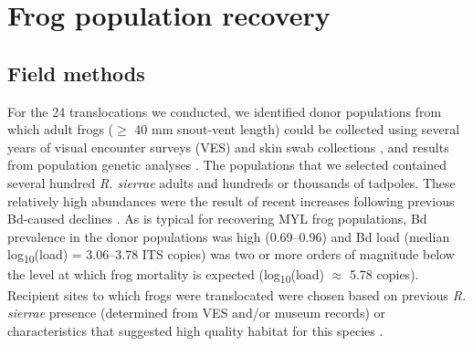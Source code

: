 \documentclass[9pt,twocolumn,twoside,lineno]{pnas-new}
\begin{document}
{\hypertarget{frog-population-recovery-1}{%
\section*{Frog population recovery}\label{frog-population-recovery-1}}

\hypertarget{field-methods}{%
\subsection*{Field methods}\label{field-methods}}

For the 24 translocations we conducted, we identified donor populations
from which adult frogs (\(\geq\) 40 mm snout-vent length) could be
collected using several years of visual encounter surveys (VES) and skin
swab collections \citep{knapp2016}, and results from population genetic
analyses \citep{poorten2017}. The populations that we selected contained
several hundred \emph{R. sierrae} adults and hundreds or thousands of
tadpoles. These relatively high abundances were the result of recent
increases following previous Bd-caused declines \citep{knapp2016}. As is
typical for recovering MYL frog populations, Bd prevalence in the donor
populations was high (0.69--0.96) and Bd load (median
log\textsubscript{10}(load) = 3.06--3.78 ITS copies) was two or more
orders of magnitude below the level at which frog mortality is expected
(log\textsubscript{10}(load) \(\approx\) 5.78
copies)\citep{vredenburg2010, joseph2018}. Recipient sites to which
frogs were translocated were chosen based on previous \emph{R. sierrae}
presence (determined from VES and/or museum records) or characteristics
that suggested high quality habitat for this species \citep{knapp2005}.

}
\end{document}
